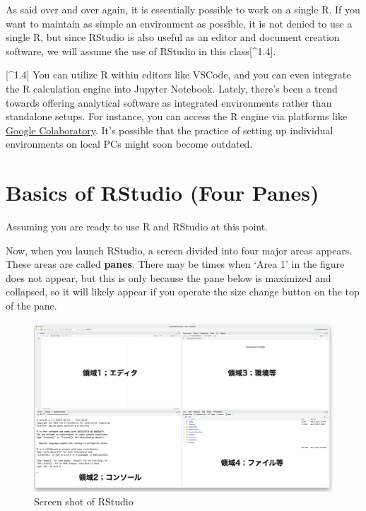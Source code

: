 \documentclass[
  a4paper,
]{book}
\begin{document}
As said over and over again, it is essentially possible to work on a
single R. If you want to maintain as simple an environment as possible,
it is not denied to use a single R, but since RStudio is also useful as
an editor and document creation software, we will assume the use of
RStudio in this class{[}\^{}1.4{]}.

{[}\^{}1.4{]} You can utilize R within editors like VSCode, and you can
even integrate the R calculation engine into Jupyter Notebook. Lately,
there's been a trend towards offering analytical software as integrated
environments rather than standalone setups. For instance, you can access
the R engine via platforms like
\href{https://colab.research.google.com/}{Google Colaboratory}. It's
possible that the practice of setting up individual environments on
local PCs might soon become outdated.

\section{Basics of RStudio (Four
Panes)}\label{basics-of-rstudio-four-panes}

Assuming you are ready to use R and RStudio at this point.

Now, when you launch RStudio, a screen divided into four major areas
appears. These areas are called \textbf{panes}. There may be times when
`Area 1' in the figure does not appear, but this is only because the
pane below is maximized and collapsed, so it will likely appear if you
operate the size change button on the top of the pane.

\begin{figure}[H]

{\centering \includegraphics{../common/images/01_RStudioStart.png}

}

\caption{Screen shot of RStudio}

\end{figure}%
\end{document}
